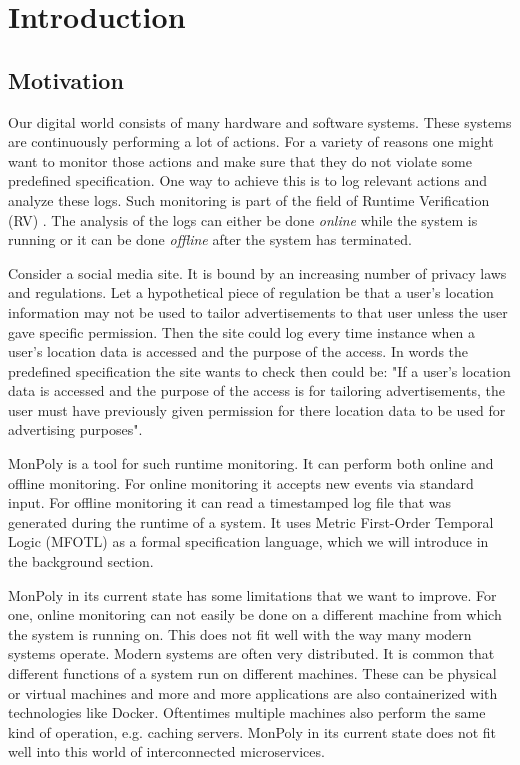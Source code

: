 \section{Introduction}

\subsection{Motivation}

Our digital world consists of many hardware and software systems.
These systems are continuously performing a lot of actions.
For a variety of reasons one might want to monitor those actions and make sure that they do not violate some predefined specification.
One way to achieve this is to log relevant actions and analyze these logs.
Such monitoring is part of the field of Runtime Verification (RV) \cite{Bartocci2018}.
The analysis of the logs can either be done \textit{online} while the system is running or it can be done \textit{offline} after the system has terminated.

Consider a social media site.
It is bound by an increasing number of privacy laws and regulations.
Let a hypothetical piece of regulation be that a user's location information may not be used to tailor advertisements to that user unless the user gave specific permission.
Then the site could log every time instance when a user's location data is accessed and the purpose of the access.
In words the predefined specification the site wants to check then could be:
    "If a user's location data is accessed and the purpose of the access is for tailoring advertisements, the user must have previously given permission for there location data to be used for advertising purposes".

MonPoly \cite{Basin2017} is a tool for such runtime monitoring.
It can perform both online and offline monitoring.
For online monitoring it accepts new events via standard input.
For offline monitoring it can read a timestamped log file that was generated during the runtime of a system.
It uses Metric First-Order Temporal Logic (MFOTL) \cite{Basin2008, Basin2015, Chomicki1995} as a formal specification language, which we will introduce in the background section.

MonPoly in its current state has some limitations that we want to improve.
For one, online monitoring can not easily be done on a different machine from which the system is running on.
This does not fit well with the way many modern systems operate.
Modern systems are often very distributed.
It is common that different functions of a system run on different machines.
These can be physical or virtual machines and more and more applications are also containerized with technologies like Docker.
Oftentimes multiple machines also perform the same kind of operation, e.g. caching servers.
MonPoly in its current state does not fit well into this world of interconnected microservices.

